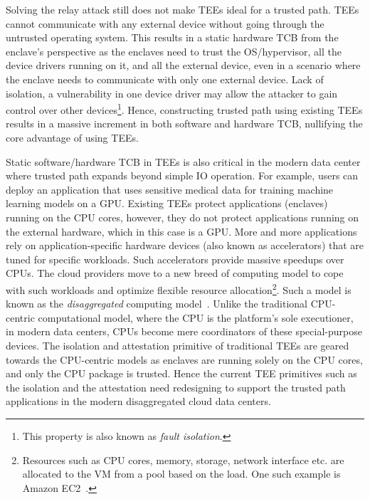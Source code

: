  Solving the relay attack still does not make TEEs ideal for a trusted path. TEEs cannot communicate with any external device without going through the untrusted operating system. This results in a static hardware TCB from the enclave's perspective as the enclaves need to trust the OS/hypervisor, all the device drivers running on it, and all the external device, even in a scenario where the enclave needs to communicate with only one external device. Lack of isolation, a vulnerability in one device driver may allow the attacker to gain control over other devices\footnote{This property is also known as \emph{fault isolation}.}. Hence, constructing trusted path using existing TEEs results in a massive increment in both software and hardware TCB, nullifying the core advantage of using TEEs.


 Static software/hardware TCB in TEEs is also critical in the modern data center where trusted path expands beyond simple IO operation. For example, users can deploy an application that uses sensitive medical data for training machine learning models on a GPU. Existing TEEs protect applications (enclaves) running on the CPU cores, however, they do not protect applications running on the external hardware, which in this case is a GPU. More and more applications rely on application-specific hardware devices (also known as accelerators) that are tuned for specific workloads. Such accelerators provide massive speedups over CPUs. The cloud providers move to a new breed of computing model to cope with such workloads and optimize flexible resource allocation\footnote{Resources such as CPU cores, memory, storage, network interface etc. are allocated to the VM from a pool based on the load. One such example is Amazon EC2~\cite{ec2}.}. Such a model is known as the \emph{disaggregated} computing model~\cite{disaggregatedcomp}. Unlike the traditional CPU-centric computational model, where the CPU is the platform's sole executioner, in modern data centers, CPUs become mere coordinators of these special-purpose devices. The isolation and attestation primitive of traditional TEEs are geared towards the CPU-centric models as enclaves are running solely on the CPU cores, and only the CPU package is trusted. Hence the current TEE primitives such as the isolation and the attestation need redesigning to support the trusted path applications in the modern disaggregated cloud data centers.